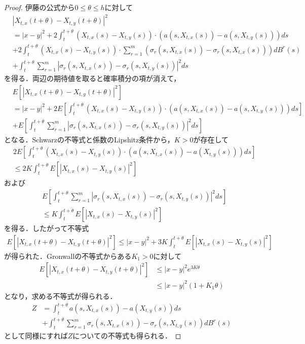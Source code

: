 \documentclass[dvipdfmx,autodetect-engine]{jsarticle}
\theoremstyle{remark}
\theoremstyle{definition}
\newcommand{\abs}[1]{\left\lvert#1\right\rvert}
\begin{document}
\begin{proof}
    伊藤の公式から$0\leq \theta \leq h$に対して
    \begin{align}
        &\abs{X_{t,x}(t+\theta)-X_{t,y}(t+\theta)}^{2} \\
        &= \abs{x-y}^{2} + 
        2\int_{t}^{t+\theta} (X_{t,x}(s)-X_{t,y}(s))\cdot (a(s,X_{t,x}(s))-a(s,X_{t,y}(s)))ds \\
        &+ 2\int_{t}^{t+\theta} (X_{t,x}(s)-X_{t,y}(s)) 
        \cdot \sum_{r=1}^{m} (\sigma_{r}(s,X_{t,x}(s))-\sigma_{r}(s,X_{t,x}(s))) dB^{r}(s)\\
        &+ \int_{t}^{t+\theta} \sum_{r=1}^{m} 
        \abs{\sigma_{r}(s,X_{t,x}(s))-\sigma_{r}(s,X_{t,y}(s))}^{2} ds
    \end{align}
    を得る．両辺の期待値を取ると確率積分の項が消えて，
    \begin{align}
        &E[\abs{X_{t,x}(t+\theta)-X_{t,y}(t+\theta)}^{2}] \\
        &= \abs{x-y}^{2} + 
        2E\left[\int_{t}^{t+\theta} (X_{t,x}(s)-X_{t,y}(s))
        \cdot (a(s,X_{t,x}(s))-a(s,X_{t,y}(s)))ds \right]\\
        &+ E\left[
            \int_{t}^{t+\theta} \sum_{r=1}^{m} 
        \abs{\sigma_{r}(s,X_{t,x}(s))-\sigma_{r}(s,X_{t,y}(s))}^{2} ds
        \right]
    \end{align}
    となる．Schwarzの不等式と係数のLipshitz条件から，$K>0$が存在して
    \begin{align}
        &2E\left[\int_{t}^{t+\theta} (X_{t,x}(s)-X_{t,y}(s))
        \cdot (a(s,X_{t,x}(s))-a(X_{t,y}(s)))ds \right]\\
        &\leq 2K \int_{t}^{t+\theta} E[\abs{X_{t,x}(s)-X_{t,y}(s)}^{2}]
    \end{align}
    および
    \begin{align}
        &E\left[
            \int_{t}^{t+\theta} \sum_{r=1}^{m} 
        \abs{\sigma_{r}(s,X_{t,x}(s))-\sigma_{r}(s,X_{t,y}(s))}^{2} ds
        \right]\\
        &\leq K \int_{t}^{t+\theta} E[\abs{X_{t,x}(s)-X_{t,y}(s)}^{2}]
    \end{align}
    を得る．したがって不等式
    \begin{align}
        E[\abs{X_{t,x}(t+\theta)-X_{t,y}(t+\theta)}^{2}] \leq
        \abs{x-y}^{2} + 3K \int_{t}^{t+\theta} E[\abs{X_{t,x}(s)-X_{t,y}(s)}^{2}]
    \end{align}
    が得られた．Gronwallの不等式からある$K_{1}>0$に対して
    \begin{align}
        E[\abs{X_{t,x}(t+\theta)-X_{t,y}(t+\theta)}^{2}]
        &\leq \abs{x-y}^{2} e^{3K \theta }\\
        &\leq \abs{x-y}^{2} (1+K_{1}\theta)
    \end{align}
    となり，求める不等式が得られる．
    \begin{align}
        Z &= \int_{t}^{t+\theta} a(s,X_{t,x}(s))-a(X_{t,y}(s)) ds \\
        &+ \int_{t}^{t+\theta} \sum_{r=1}^{m} 
        \sigma_{r}(s,X_{t,x}(s))-\sigma_{r}(s,X_{t,y}(s)) dB^{r}(s)
    \end{align}
    として同様にすれば$Z$についての不等式も得られる．
\end{proof}
\end{document}
